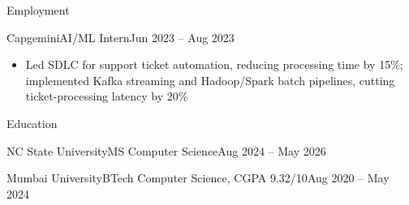 \documentclass{mcdowellcv}
\begin{document}
\begin{cvsection}{Employment}
  \begin{cvsubsection}{Capgemini}{AI/ML Intern}{Jun 2023 -- Aug 2023}
    \begin{itemize}
      \item Led SDLC for support ticket automation, reducing processing time by 15\%; implemented Kafka streaming and Hadoop/Spark batch pipelines, cutting ticket-processing latency by 20\%
    \end{itemize}
  \end{cvsubsection}

\end{cvsection}

\begin{cvsection}{Education}

  \begin{cvsubsection}{NC State University}{MS Computer Science}{Aug 2024 -- May 2026}
  \end{cvsubsection}

  \begin{cvsubsection}{Mumbai University}{BTech Computer Science, CGPA 9.32/10}{Aug 2020 -- May 2024}
  \end{cvsubsection}

\end{cvsection}
\end{document}
